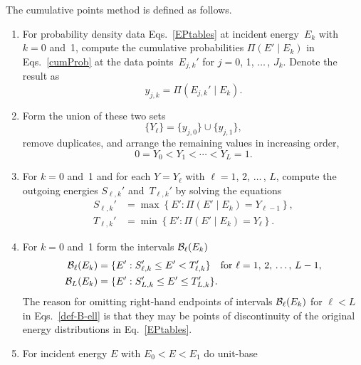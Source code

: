The cumulative points method is defined as
follows.
\begin{enumerate}
\item For probability density data Eqs.~\eqref{EPtables}
at incident energy~$E_k$ with $k = 0$ and~1, compute the cumulative
probabilities $\Pi( E' \mid E_k )$ in Eqs.~\eqref{cumProb}
at the data points~$E_{j,k}'$ for $j = 0$, 1, $\ldots\,$, $J_k$.  
Denote the result as
\begin{equation}
  y_{j,k} = \Pi( E_{j,k}' \mid E_k ).
 \label{def-phijk}
\end{equation}
\item Form the union of these two sets
\begin{equation}
   \{Y_\ell\} = \{y_{j,0}\} \cup \{y_{j,1}\},
 \label{def-Phi-cup}
\end{equation}
remove duplicates, and arrange the remaining values
in increasing order,
\begin{equation}
  0 = Y_0 < Y_1 < \cdots < Y_L = 1.
 \label{Phi-ordered}
\end{equation}
\item For $k = 0$ and~1 and for each $Y = Y_\ell$ with
$\ell = 1$, 2, $\ldots\,$, $L$,
compute the outgoing energies
$S_{\ell,k}'$ and~$T_{\ell,k}'$ by solving the equations
\begin{equation}
 \begin{split}
     S_{\ell,k}' &= \max \left \{ E': \Pi(E' \mid E_k ) = Y_{\ell-1} \right \}, \\
      T_{\ell,k}' &= \min \left \{ E': \Pi(E' \mid E_k ) = Y_\ell \right \}.
 \end{split}
  \label{T-cum-prob-inv}
\end{equation}
\item For $k = 0$ and~1 form the intervals ${\cal B}_\ell(E_k)$
\begin{equation}
 \begin{split}
   {\cal B}_\ell(E_k) &= \{E' : S_{\ell,k}' \le E' < T_{\ell,k}' \} 
     \quad \text{for $\ell = 1$,~2, $\ldots\,$,~$L-1$,} \\
   {\cal B}_L(E_k) &= \{E' : S_{L,k}' \le E' \le T_{L,k}' \}.
 \end{split}
  \label{def-B-ell}
\end{equation}
The reason for omitting right-hand endpoints of
intervals ${\cal B}_\ell(E_k)$ for $\ell < L$ in Eqs.~\eqref{def-B-ell}
is that they may be points of discontinuity
of the original energy distributions in Eq.~\eqref{EPtables}.
\item For incident energy $E$ with $E_0 < E < E_1$ do unit-base

\end{enumerate}
